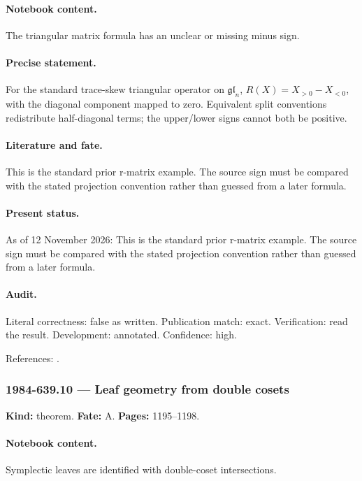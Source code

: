 \paragraph{Notebook content.} The triangular matrix formula has an unclear or missing minus sign.

\paragraph{Precise statement.} For the standard trace-skew triangular operator on \(\mathfrak{gl}_n\), \(R(X)=X_{>0}-X_{<0}\), with the diagonal component mapped to zero. Equivalent split conventions redistribute half-diagonal terms; the upper/lower signs cannot both be positive.

\paragraph{Literature and fate.} This is the standard prior r-matrix example. The source sign must be compared with the stated projection convention rather than guessed from a later formula.

\paragraph{Present status.} As of 12 November 2026: This is the standard prior r-matrix example. The source sign must be compared with the stated projection convention rather than guessed from a later formula.

\paragraph{Audit.} Literal correctness: false as written. Publication match: exact. Verification: read the result. Development: annotated. Confidence: high.

\noindent References: \citep{semenov1983classical}.\par

\subsubsection{1984-639.10 --- Leaf geometry from double cosets}

\label{item:1984-639.10}

\noindent\textbf{Kind:} theorem. \textbf{Fate:} A. \textbf{Pages:} 1195--1198.\par

\paragraph{Notebook content.} Symplectic leaves are identified with double-coset intersections.

